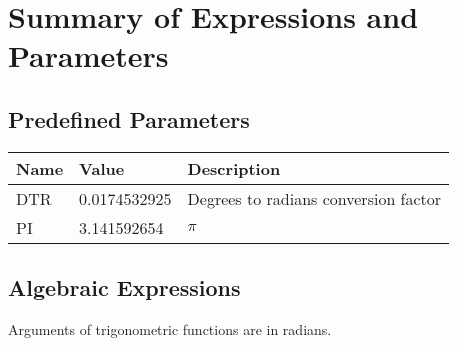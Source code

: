 \chapter{Summary of Expressions and Parameters}
\section{Predefined Parameters}
\begin{center}
\begin{tabular}{|l|l|l|}
\hline
{\bf Name} & {\bf Value}   &  {\bf Description}  \\
\hline
DTR   &0.0174532925  & Degrees to radians conversion factor \\
PI    &3.141592654   & $\pi$                                \\
\hline
\end{tabular}
\end{center}
\clearpage
\section{Algebraic Expressions}
Arguments of trigonometric functions are in radians.
